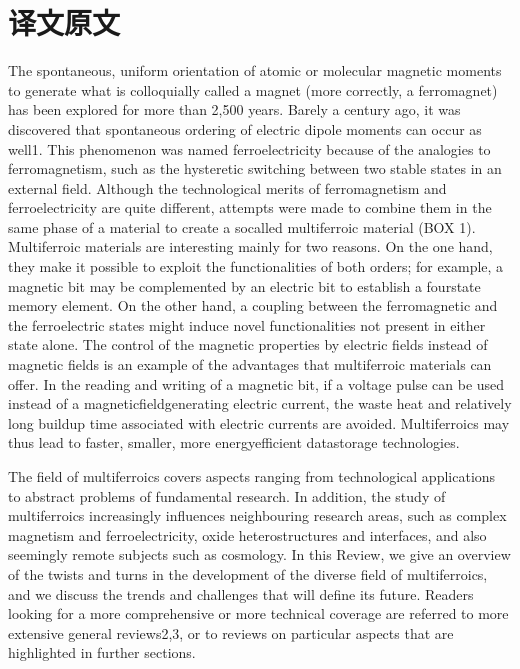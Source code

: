 \section*{译文原文}
The spontaneous, uniform orientation of atomic or molecular magnetic moments to generate what is colloquially called a magnet (more correctly, a ferromagnet) has been explored for more than 2,500 years. Barely a century ago, it was discovered that spontaneous ordering of electric dipole moments can occur as well1. This phenomenon was named ferroelectricity because of the analogies to ferromagnetism, such as the hysteretic switching between two stable states in an external field. Although the technological merits of ferromagnetism and ferroelectricity are quite different, attempts were made to combine them in the same phase of a mat­erial to create a so­called multiferroic material (BOX 1). Multiferroic materials are interesting mainly for two reasons. On the one hand, they make it possible to exploit the functionalities of both orders; for example, a magnetic bit may be complemented by an electric bit to establish a four­state memory element. On the other hand, a coupling between the ferromagnetic and the ferroelectric states might induce novel functionalities not present in either state alone. The control of the magnetic properties by electric fields instead of magnetic fields is an example of the advantages that multiferroic materials can offer. In the reading and writing of a magnetic bit, if a voltage pulse can be used instead of a magnetic­field­generating electric current, the waste heat and relatively long build­up time associated with electric currents are avoided. Multiferroics may thus lead to faster, smaller, more energy­efficient data­storage technologies.

The field of multiferroics covers aspects ranging from technological applications to abstract problems of fundamental research. In addition, the study of multiferroics increasingly influences neighbouring research areas, such as complex magnetism and ferroelectricity, oxide heterostructures and interfaces, and also seemingly remote subjects such as cosmology. In this Review, we give an overview of the twists and turns in the development of the diverse field of multiferroics, and we discuss the trends and challenges that will define its future. Readers looking for a more comprehensive or more technical coverage are referred to more extensive general reviews2,3, or to reviews on particular aspects that are highlighted in further sections.

